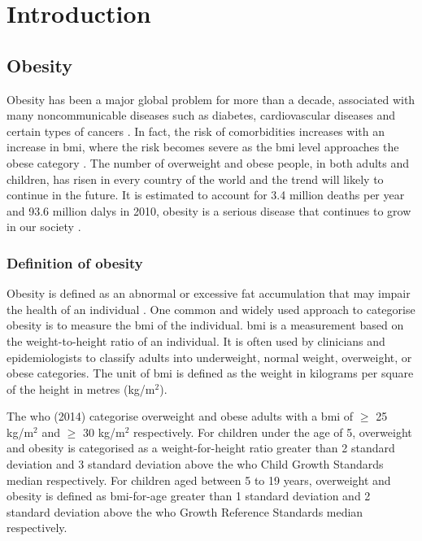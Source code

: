 \chapter{Introduction}
\label{ch:intro}

\section{Obesity}
\label{sec:obesity}

Obesity has been a major global problem for more than a decade, associated with many noncommunicable diseases such as diabetes, cardiovascular diseases and certain types of cancers \citep{WHO2014}.
In fact, the risk of comorbidities increases with an increase in \gls{bmi}, where the risk becomes severe as the \gls{bmi} level approaches the obese category \citep{WHO2000}.
The number of overweight and obese people, in both adults and children, has risen in every country of the world and the trend will likely to continue in the future.
It is estimated to account for 3.4 million deaths per year and 93.6 million \glspl{daly} in 2010, obesity is a serious disease that continues to grow in our society \citep{Lim2012}.

\subsection{Definition of obesity}
\label{sub:definition_of_obesity}

Obesity is defined as an abnormal or excessive fat accumulation that may impair the health of an individual \citep{Garrow1988}.
One common and widely used approach to categorise obesity is to measure the \gls{bmi} of the individual.
\gls{bmi} is a measurement based on the weight-to-height ratio of an individual.
It is often used by clinicians and epidemiologists to classify adults into underweight, normal weight, overweight, or obese categories.
The unit of \gls{bmi} is defined as the weight in kilograms per square of the height in metres (kg/m$^2$).

The \gls{who} (2014) categorise overweight and obese adults  with a \gls{bmi} of  $\geq$ 25 kg/m$^2$ and $\geq$ 30 kg/m$^2$ respectively.
For children under the age of 5, overweight and obesity is categorised as a  weight-for-height ratio greater than 2 standard deviation and 3 standard deviation above the \gls{who} Child Growth Standards median respectively.
For children aged between 5 to 19 years, overweight and obesity is defined as \gls{bmi}-for-age greater than 1 standard deviation and 2 standard deviation above the \gls{who} Growth Reference Standards median respectively.

